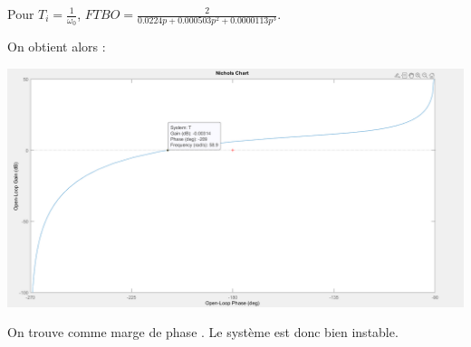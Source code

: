 \documentclass[12pt]{article}
\begin{document}
\begin{center}
    \normalsize Pour $T_i = \frac{1}{\omega_0}$, \large $FTBO = \frac{2}{0.0224p + 0.000503p^2 + 0.0000113p^3}$.
\end{center}
\newpage
\normalsize On obtient alors :
\begin{center}
    \includegraphics[width = 19 cm]{TP2 Simulink/Syst_2/nichols_4.2_Ti=1_sur_omega0.png}
\end{center}
On trouve comme marge de phase . Le système est donc bien instable.
\end{document}
